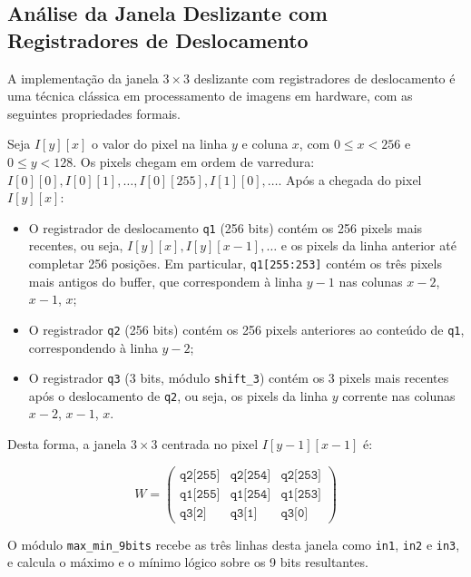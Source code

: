 \documentclass[12pt, a4paper]{article}
\begin{document}
	\subsection{Análise da Janela Deslizante com Registradores de Deslocamento}
	
	A implementação da janela $3\times3$ deslizante com registradores de deslocamento
	é uma técnica clássica em processamento de imagens em hardware, com as seguintes
	propriedades formais.
	
	Seja $I[y][x]$ o valor do pixel na linha $y$ e coluna $x$, com $0 \leq x < 256$
	e $0 \leq y < 128$. Os pixels chegam em ordem de varredura: $I[0][0], I[0][1],
	\ldots, I[0][255], I[1][0], \ldots$. Após a chegada do pixel $I[y][x]$:
	
	\begin{itemize}
		\item O registrador de deslocamento \texttt{q1} (256 bits) contém os 256
		pixels mais recentes, ou seja, $I[y][x], I[y][x-1], \ldots$ e os pixels
		da linha anterior até completar 256 posições. Em particular,
		\texttt{q1[255:253]} contém os três pixels mais antigos do buffer, que
		correspondem à linha $y-1$ nas colunas $x-2$, $x-1$, $x$;
		\item O registrador \texttt{q2} (256 bits) contém os 256 pixels anteriores
		ao conteúdo de \texttt{q1}, correspondendo à linha $y-2$;
		\item O registrador \texttt{q3} (3 bits, módulo \texttt{shift\_3}) contém
		os 3 pixels mais recentes após o deslocamento de \texttt{q2}, ou seja,
		os pixels da linha $y$ corrente nas colunas $x-2$, $x-1$, $x$.
	\end{itemize}
	
	Desta forma, a janela $3\times3$ centrada no pixel $I[y-1][x-1]$ é:
	
	\begin{equation}
		W = \begin{pmatrix}
			\texttt{q2[255]} & \texttt{q2[254]} & \texttt{q2[253]} \\
			\texttt{q1[255]} & \texttt{q1[254]} & \texttt{q1[253]} \\
			\texttt{q3[2]}   & \texttt{q3[1]}   & \texttt{q3[0]}
		\end{pmatrix}
		\label{eq:janela}
	\end{equation}
	
	O módulo \texttt{max\_min\_9bits} recebe as três linhas desta janela como
	\texttt{in1}, \texttt{in2} e \texttt{in3}, e calcula o máximo e o mínimo
	lógico sobre os 9 bits resultantes.
	
\end{document}
